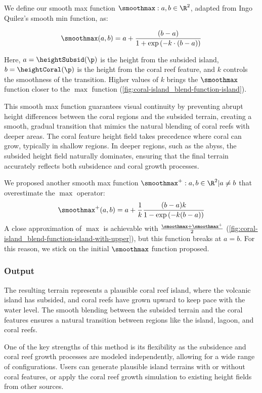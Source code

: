 We define our smooth max function $\smoothmax: a, b \in \R^2$, adapted from Ingo Quilez's smooth min function, as:

\begin{align}
    \smoothmax(a, b) = a + \frac{(b - a)}{1 + \exp\left(-k \cdot (b - a)\right)}
\end{align}

Here, $a = \heightSubsid(\p)$ is the height from the subsided island, $b = \heightCoral(\p)$ is the height from the coral reef feature, and $k$ controls the smoothness of the transition. Higher values of $k$ brings the $\smoothmax$ function closer to the $\max$ function (\cref{fig:coral-island_blend-function-island}).

This smooth max function guarantees visual continuity by preventing abrupt height differences between the coral regions and the subsided terrain, creating a smooth, gradual transition that mimics the natural blending of coral reefs with deeper areas. The coral feature height field takes precedence where coral can grow, typically in shallow regions. In deeper regions, such as the abyss, the subsided height field naturally dominates, ensuring that the final terrain accurately reflects both subsidence and coral growth processes.

We proposed another smooth max function $\smoothmax^+: a, b \in \R^2 | a \neq b$ that overestimate the $\max$ operator:
\begin{align}
    \smoothmax^+(a, b) = a + \frac{1}{k} \frac{(b - a) k}{1 - \exp\left(-k (b - a)\right)}
\end{align}
A close approximation of $\max$ is achievable with $\frac{\smoothmax + \smoothmax^+}{2}$ (\cref{fig:coral-island_blend-function-island-with-upper}), but this function breaks at $a = b$. For this reason, we stick on the initial $\smoothmax$ function proposed.

\subsubsection{Output}

The resulting terrain represents a plausible coral reef island, where the volcanic island has subsided, and coral reefs have grown upward to keep pace with the water level. The smooth blending between the subsided terrain and the coral features ensures a natural transition between regions like the island, lagoon, and coral reefs.

One of the key strengths of this method is its flexibility as the subsidence and coral reef growth processes are modeled independently, allowing for a wide range of configurations. Users can generate plausible island terrains with or without coral features, or apply the coral reef growth simulation to existing height fields from other sources.





